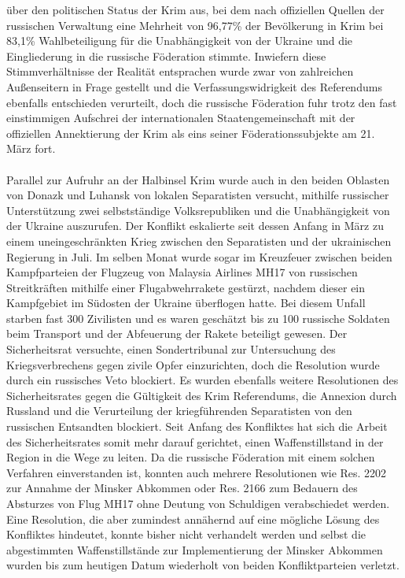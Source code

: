 \documentclass[a4paper,11pt]{article}
\begin{document}
über den politischen Status der Krim aus, bei dem nach offiziellen Quellen der russischen Verwaltung eine Mehrheit von 96,77\% der Bevölkerung in Krim bei 83,1\% Wahlbeteiligung für die Unabhängigkeit von der Ukraine und die Eingliederung in die russische Föderation stimmte. Inwiefern diese Stimmverhältnisse der Realität entsprachen wurde zwar von zahlreichen Außenseitern in Frage gestellt und die Verfassungswidrigkeit des Referendums ebenfalls entschieden verurteilt, doch die russische Föderation fuhr trotz den fast einstimmigen Aufschrei der internationalen Staatengemeinschaft mit der offiziellen Annektierung der Krim als eins seiner Föderationssubjekte am 21. März fort. \\ \\ Parallel zur Aufruhr an der Halbinsel Krim wurde auch in den beiden Oblasten von Donazk und Luhansk von lokalen Separatisten versucht, mithilfe russischer Unterstützung zwei selbstständige Volksrepubliken und die Unabhängigkeit von der Ukraine auszurufen. Der Konflikt eskalierte seit dessen Anfang in März zu einem uneingeschränkten Krieg zwischen den Separatisten und der ukrainischen Regierung in Juli. Im selben Monat wurde sogar im Kreuzfeuer zwischen beiden Kampfparteien der Flugzeug von Malaysia Airlines MH17 von russischen Streitkräften mithilfe einer Flugabwehrrakete gestürzt, nachdem dieser ein Kampfgebiet im Südosten der Ukraine überflogen hatte. Bei diesem Unfall starben fast 300 Zivilisten und es waren geschätzt bis zu 100 russische Soldaten beim Transport und der Abfeuerung der Rakete beteiligt gewesen. Der Sicherheitsrat versuchte, einen Sondertribunal zur Untersuchung des Kriegsverbrechens gegen zivile Opfer einzurichten, doch die Resolution wurde durch ein russisches Veto blockiert. Es wurden ebenfalls weitere Resolutionen des Sicherheitsrates gegen die Gültigkeit des Krim Referendums, die Annexion durch Russland und die Verurteilung der kriegführenden Separatisten von den russischen Entsandten blockiert. Seit Anfang des Konfliktes hat sich die Arbeit des Sicherheitsrates somit mehr darauf gerichtet, einen Waffenstillstand in der Region in die Wege zu leiten. Da die russische Föderation mit einem solchen Verfahren einverstanden ist, konnten auch mehrere Resolutionen wie Res. 2202 zur Annahme der Minsker Abkommen oder Res. 2166 zum Bedauern des Absturzes von Flug MH17 ohne Deutung von Schuldigen verabschiedet werden. Eine Resolution, die aber zumindest annähernd auf eine mögliche Lösung des Konfliktes hindeutet, konnte bisher nicht verhandelt werden und selbst die abgestimmten Waffenstillstände zur Implementierung der Minsker Abkommen wurden bis zum heutigen Datum wiederholt von beiden Konfliktparteien verletzt.
  \newpage		
\end{document}
